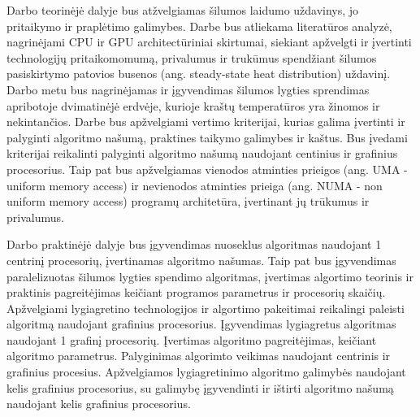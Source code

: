 \documentclass{VUMIFPSbakalaurinis}
\begin{document}
Darbo teorinėjė dalyje bus atžvelgiamas šilumos laidumo uždavinys, jo pritaikymo ir praplėtimo galimybes.
Darbe bus atliekama literatūros analyzė, nagrinėjami CPU ir GPU architectūriniai skirtumai, siekiant apžvelgti ir įvertinti technologijų pritaikomomumą, privalumus ir trukūmus spendžiant šilumos pasiskirtymo patovios busenos (ang. steady-state heat distribution) uždavinį.
Darbo metu bus nagrinėjamas ir įgyvendimas šilumos lygties sprendimas apribotoje dvimatinėjė erdvėje, kurioje kraštų temperatūros yra žinomos ir nekintančios.
Darbe bus apžvelgiami vertimo kriterijai, kurias galima įvertinti ir palyginti algoritmo našumą, praktines taikymo galimybes ir kaštus. Bus įvedami kriterijai reikalinti palyginti algoritmo našumą naudojant centinius ir grafinius procesorius.
Taip pat bus apžvelgiamas vienodos atminties prieigos (ang. UMA - uniform memory access) ir nevienodos atminties prieiga (ang. NUMA - non uniform memory access) programų architetūra, įvertinant jų trūkumus ir privalumus. 

Darbo praktinėjė dalyje bus įgyvendimas nuoseklus algoritmas naudojant 1 centrinį procesorių, įvertinamas algoritmo našumas. 
Taip pat bus įgyvendimas paralelizuotas šilumos lygties spendimo algoritmas, įvertimas algortimo teorinis ir praktinis pagreitėjimas keičiant programos parametrus ir procesorių skaičių.
Apžvelgiami lygiagretino technologijos ir algortimo pakeitimai reikalingi paleisti algoritmą naudojant grafinius procesorius. Įgyvendimas lygiagretus algoritmas naudojant 1 grafinį procesorių. Įvertimas algoritmo pagreitėjimas, keičiant algoritmo parametrus. 
Palyginimas algorimto veikimas naudojant centrinis ir grafinius procesius. Apžvelgiamos lygiagretinimo algoritmo galimybės naudojant kelis grafinius procesorius, su galimybę įgyvendinti ir ištirti algoritmo našumą naudojant kelis grafinius procesorius.


\end{document}
